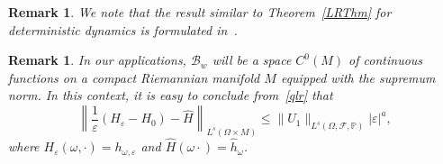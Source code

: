 \documentclass[11pt,reqno,a4paper]{article}
\theoremstyle{special}
\newtheorem{remark}[theorem]{Remark}
\renewcommand{\epsilon}{\varepsilon}
\def\N{\mathbb{N}}
\def\B{\mathcal{B}}
\begin{document}
\begin{remark}
We note that the result similar to
Theorem~\ref{LRThm} \emph{for deterministic dynamics} is formulated in~\cite[Theorem 2.3]{GP}. 
\end{remark}


\begin{remark}
In our applications, $\B_w$ will be a space $C^0(M)$ of continuous functions on a compact Riemannian manifold $M$ equipped with the supremum norm. In this context,  it is easy to conclude from~\eqref{qlr} that 
\[
\left \| \frac{1}{\epsilon}(H_\epsilon-H_0)-\hat H \right \|_{L^s(\Omega \times M)} \le \|U_1\|_{L^s(\Omega, \mathcal F, \mathbb P)}|\epsilon|^a,
\]
where $H_\epsilon (\omega, \cdot)=h_{\omega, \epsilon}$ and $\hat H(\omega \cdot)=\hat h_\omega$.
\end{remark}







\end{document}
